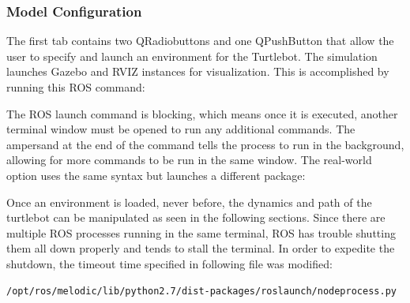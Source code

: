 \documentclass[12]{article}
\begin{document}
\subsubsection{Model Configuration}
The first tab contains two QRadiobuttons and one QPushButton that allow the user to specify and launch an environment for the Turtlebot. The simulation launches Gazebo and RVIZ instances for visualization. This is accomplished by running this ROS command:

The ROS launch command is blocking, which means once it is executed, another terminal window must be opened to run any additional commands. The ampersand at the end of the command tells the process to run in the background, allowing for more commands to be run in the same window. The real-world option uses the same syntax but launches a different package:


Once an environment is loaded, never before, the dynamics and path of the turtlebot can be manipulated as seen in the following sections. Since there are multiple ROS processes running in the same terminal, ROS has trouble shutting them all down properly and tends to stall the terminal. In order to expedite the shutdown, the timeout time specified in following file was modified:

\begin{lstlisting}[style=bash]
/opt/ros/melodic/lib/python2.7/dist-packages/roslaunch/nodeprocess.py
\end{lstlisting}
\end{document}
